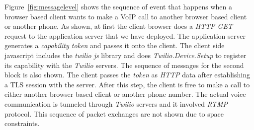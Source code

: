 Figure~\ref{fig:messagelevel} shows the sequence of event that happens when a browser based client wants to make a VoIP call to another browser based client or another phone. As shown, at first the client browser does a \textit{HTTP GET} request to the application server that we have deployed. The application server generates a \textit{capability token} and passes it onto the client. The client side javascript includes the \textit{twilio js} library and does \textit{Twilio.Device.Setup} to register its capability with the \textit{Twilio} servers. The sequence of messages for the second block is also shown. The client passes the \textit{token} as \textit{HTTP} data after establishing a TLS session with the server. After this step, the client is free to make a call to either another browser based client or another phone number. The actual voice communication is tunneled through \textit{Twilio} servers and it involved \textit{RTMP} protocol. This sequence of packet exchanges are not shown due to space constraints. 
